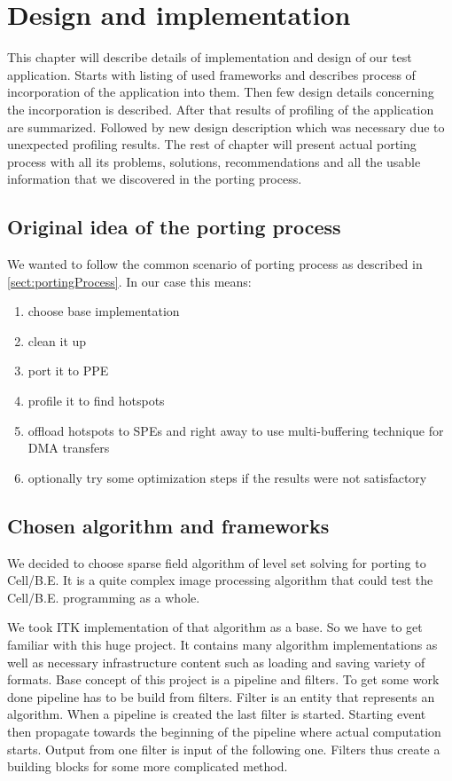 \chapter{Design and implementation}

This chapter will describe details of implementation and design of our test application.
Starts with listing of used frameworks and describes process of incorporation of the application into them.
Then few design details concerning the incorporation is described.
After that results of profiling of the application are summarized.
Followed by new design description which was necessary due to unexpected profiling results.
The rest of chapter will present actual porting process with all its problems, solutions, recommendations and all the usable information that we discovered in the porting process.

\section{Original idea of the porting process}

We wanted to follow the common scenario of porting process as described in \ref{sect:portingProcess}.
In our case this means:
\begin{enumerate}
\item{choose base implementation}
\item{clean it up}
\item{port it to PPE}
\item{profile it to find hotspots}
\item{offload hotspots to SPEs and right away to use multi-buffering technique for DMA transfers}
\item{optionally try some optimization steps if the results were not satisfactory}
\end{enumerate}

\section{Chosen algorithm and frameworks}

\par
We decided to choose sparse field algorithm of level set solving for porting to Cell/B.E.
It is a quite complex image processing algorithm that could test the Cell/B.E. programming as a whole.

\par
We took ITK \cite{itk} implementation of that algorithm as a base.
So we have to get familiar with this huge project.
It contains many algorithm implementations as well as necessary infrastructure content such as loading and saving variety of formats.
Base concept of this project is a pipeline and filters.
To get some work done pipeline has to be build from filters.
Filter is an entity that represents an algorithm.
When a pipeline is created the last filter is started.
Starting event then propagate towards the beginning of the pipeline where actual computation starts.
Output from one filter is input of the following one.
Filters thus create a building blocks for some more complicated method.

